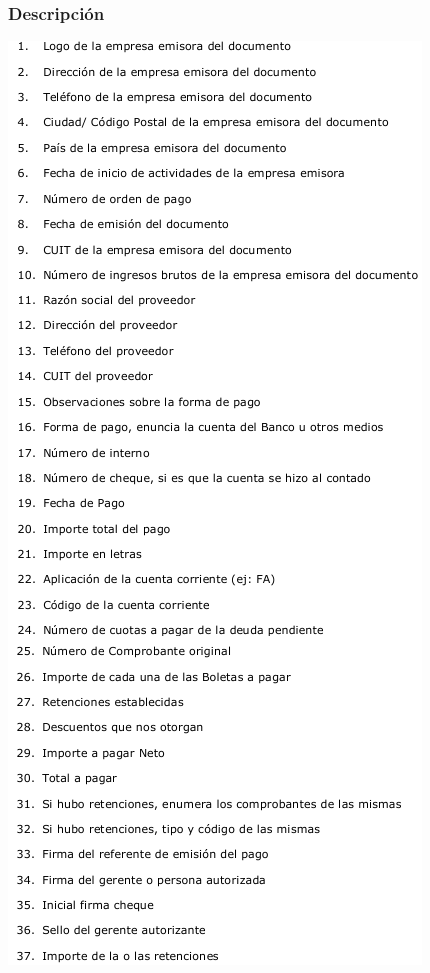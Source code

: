 \subsubsection{Descripción}
\begin{center}
 \includegraphics[keepaspectratio=true]{./Circuitos-Teoricos/Pago-a-Proveedores/Images/descripcion-orden-de-pago.png}
\end{center}

